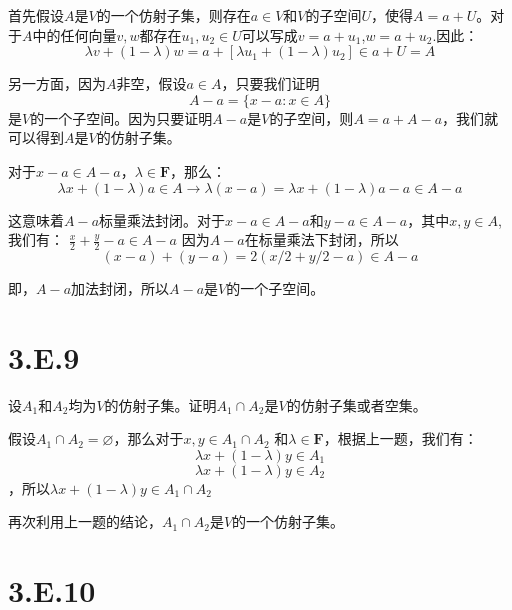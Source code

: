 \documentclass[10pt,a4paper,UTF8]{article}
\begin{document}
\begin{answer}
首先假设\(A\)是\(V\)的一个仿射子集，则存在\(a\in V\)和\(V\)的子空间\(U\)，使得\(A = a+ U\)。对于\(A\)中的任何向量\(v,w\)都存在\(u_{1},u_{2}\in U\)可以写成\(v = a+ u_{1}\),\(w = a+ u_{2}\).因此：
\[\lambda v + (1-\lambda)w = a + [\lambda u_{1} + (1-\lambda)u_{2}] \in a + U = A\]

另一方面，因为\(A\)非空，假设\(a\in A\)，只要我们证明\[A-a = \{x-a:x\in A\}\] 是\(V\)的一个子空间。因为只要证明\(A-a\)是\(V\)的子空间，则\(A = a+A-a\)，我们就可以得到\(A\)是\(V\)的仿射子集。

对于\(x-a\in A -a\)，\(\lambda \in \mathbf{F}\)，那么：
\begin{equation}
\label{eq:1}
\lambda x + (1-\lambda)a \in A \rightarrow \lambda(x-a) = \lambda x + (1-\lambda)a -a \in A -a
\end{equation}

这意味着\(A-a\)标量乘法封闭。对于\(x-a\in A-a\)和\(y-a\in A-a\)，其中\(x,y\in A\),我们有：
\(\frac{x}{2} + \frac{y}{2} -a \in A -a\) 因为\(A-a\)在标量乘法下封闭，所以\[(x-a) + (y-a) = 2(x/2 + y/2 -a) \in A-a\]

即，\(A-a\)加法封闭，所以\(A-a\)是\(V\)的一个子空间。
\end{answer}
\section{3.E.9}
\label{sec:org515ab8a}


\begin{problem}
设\(A_{1}\)和\(A_{2}\)均为\(V\)的仿射子集。证明\(A_{1}\cap A_{2}\)是\(V\)的仿射子集或者空集。
\end{problem}

\begin{answer}
假设\(A_{1}\cap A_{2}  = \varnothing\)，那么对于\(x,y\in A_{1}\cap A_{2}\) 和\(\lambda \in \mathbf{F}\)，根据上一题，我们有：
\begin{equation}
\label{eq:2}
\lambda x + (1-\lambda)y \in A_{1}
\end{equation}
\begin{equation}
\label{eq:3}
\lambda x + (1-\lambda)y \in A_{2}
\end{equation}
，所以\(\lambda x + (1-\lambda)y \in A_{1} \cap A_{2}\)

再次利用上一题的结论，\(A_{1}\cap A_{2}\)是\(V\)的一个仿射子集。
\end{answer}
\section{3.E.10}
\label{sec:orgcdd6fd9}
\end{document}
